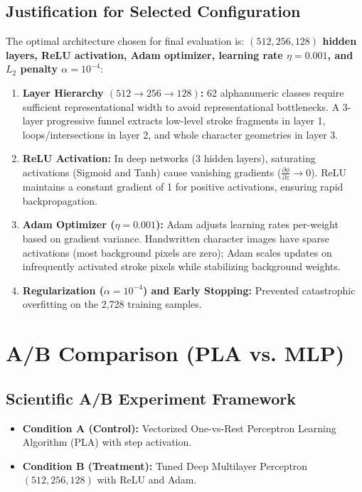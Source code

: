 \documentclass[12pt,a4paper]{article}
\begin{document}
\subsection{Justification for Selected Configuration}
The optimal architecture chosen for final evaluation is: \textbf{$(512, 256, 128)$ hidden layers, ReLU activation, Adam optimizer, learning rate $\eta = 0.001$, and $L_2$ penalty $\alpha = 10^{-4}$}:
\begin{enumerate}
\item \textbf{Layer Hierarchy $(512 \to 256 \to 128)$:} 62 alphanumeric classes require sufficient representational width to avoid representational bottlenecks. A 3-layer progressive funnel extracts low-level stroke fragments in layer 1, loops/intersections in layer 2, and whole character geometries in layer 3.
\item \textbf{ReLU Activation:} In deep networks (3 hidden layers), saturating activations (Sigmoid and Tanh) cause vanishing gradients ($\frac{\partial \phi}{\partial z} \to 0$). ReLU maintains a constant gradient of 1 for positive activations, ensuring rapid backpropagation.
\item \textbf{Adam Optimizer ($\eta=0.001$):} Adam adjusts learning rates per-weight based on gradient variance. Handwritten character images have sparse activations (most background pixels are zero); Adam scales updates on infrequently activated stroke pixels while stabilizing background weights.
\item \textbf{Regularization ($\alpha=10^{-4}$) and Early Stopping:} Prevented catastrophic overfitting on the 2,728 training samples.
\end{enumerate}

\section{A/B Comparison (PLA vs. MLP)}

\subsection{Scientific A/B Experiment Framework}
\begin{itemize}
\item \textbf{Condition A (Control):} Vectorized One-vs-Rest Perceptron Learning Algorithm (PLA) with step activation.
\item \textbf{Condition B (Treatment):} Tuned Deep Multilayer Perceptron $(512, 256, 128)$ with ReLU and Adam.
\end{itemize}
\end{document}
